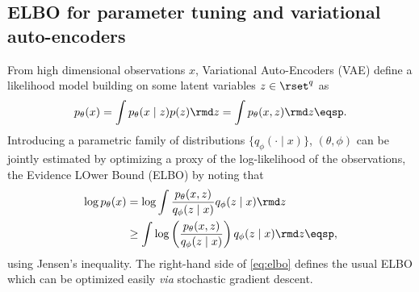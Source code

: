 \subsection{ELBO for parameter tuning and variational auto-encoders}\label{subsec:VAE}

From high dimensional observations $x$, Variational Auto-Encoders (VAE) define a likelihood model building on some latent variables $z\in\rset^q$ as 
\begin{equation}
p_\theta(x) = \int p_\theta(x\mid z) p(z) \rmd z = \int p_\theta(x,z) \rmd z\eqsp.
\end{equation}
Introducing a parametric family of distributions $\{q_\phi(\cdot\mid x)\}$, $(\theta,\phi)$ can be jointly estimated by optimizing a proxy of the log-likelihood of the observations, the Evidence LOwer Bound (ELBO) by noting that  
\begin{align}
\log p_\theta(x)  &= \log \int \frac{p_\theta(x,z) }{q_\phi(z\mid x)} q_\phi(z\mid x)\rmd z \nonumber\\
&\geq \int \log\left(\frac{p_\theta(x,z)}{q_\phi(z\mid x)}\right) q_\phi(z\mid x)\rmd z\eqsp,\label{eq:elbo}%
\end{align} 
using Jensen's inequality. The right-hand side of \eqref{eq:elbo} defines the usual ELBO which can be optimized easily \emph{via} stochastic gradient descent.

